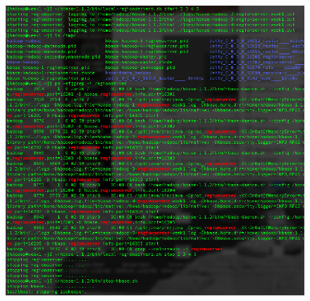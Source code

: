 \documentclass[10pt]{article}
\begin{document}
\begin{figure}[!h]
\includegraphics[scale=0.37]{psuedo_end.png}
\centering
\end{figure}\\
\end{document}

